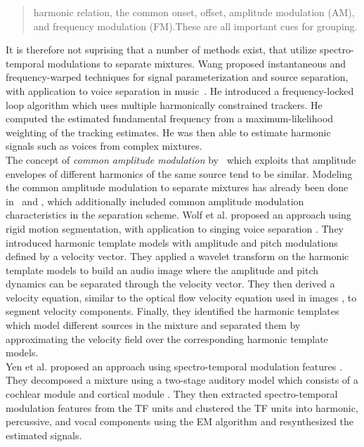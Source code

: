 \begin{quote}
harmonic relation, the common onset, offset, amplitude modulation (AM), and frequency modulation (FM).These are all important cues for grouping.  
\end{quote}

It is therefore not suprising that a number of methods exist, that utilize spectro-temporal modulations to separate mixtures.
Wang proposed instantaneous and frequency-warped techniques for signal parameterization and source separation, with application to voice separation in music~\cite{wang94,wang95}.
He introduced a frequency-locked loop algorithm which uses multiple harmonically constrained trackers.
He computed the estimated fundamental frequency from a maximum-likelihood weighting of the tracking estimates. He was then able to estimate harmonic signals such as voices from complex mixtures.\\
The concept of \emph{common amplitude modulation} by~\cite{bregman, wang06} which exploits that amplitude envelopes of different harmonics of the same source tend to be similar.
Modeling the common amplitude modulation to separate mixtures has already been done in~\cite{li07, li09} and \cite{cano14}, which additionally included common amplitude modulation characteristics in the separation scheme.
Wolf et al. proposed an approach using rigid motion segmentation, with application to singing voice separation \cite{wolf14,wolf16}. They introduced harmonic template models with amplitude and pitch modulations defined by a velocity vector. They applied a wavelet transform \cite{anden14} on the harmonic template models to build an audio image where the amplitude and pitch dynamics can be separated through the velocity vector. They then derived a velocity equation, similar to the optical flow velocity equation used in images \cite{bernard01}, to segment velocity components. Finally, they identified the harmonic templates which model different sources in the mixture and separated them by approximating the velocity field over the corresponding harmonic template models.\\
Yen et al. proposed an approach using spectro-temporal modulation features \cite{yen14,yen15}. They decomposed a mixture using a two-stage auditory model which consists of a cochlear module \cite{chi05} and cortical module \cite{chi99}. They then extracted spectro-temporal modulation features from the TF units and clustered the TF units into harmonic, percussive, and vocal components using the EM algorithm and resynthesized the estimated signals.\\
